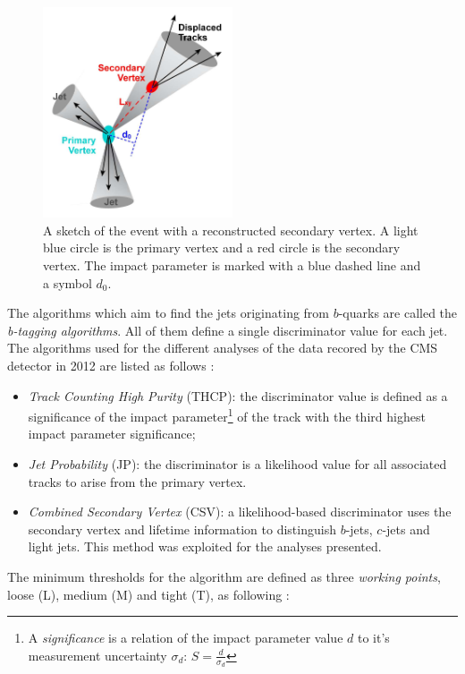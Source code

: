 \begin{figure}[t]
  \centering
  \includegraphics[width=0.5\textwidth]{04_event_reconstruction/plots/btagging_cartoon.png}
  \caption{A sketch of the event with a reconstructed secondary vertex. A light blue circle is the primary vertex and a red circle is the secondary vertex. The impact 
  parameter is marked with a blue dashed line and a symbol $d_{0}$.}
  \label{fig:SV}
\end{figure}

The algorithms which aim to find the jets originating from $b$-quarks are called the \textit{b-tagging algorithms}. All of them define a single discriminator value for each jet.
The algorithms used for the different analyses of the data recored by the CMS detector in 2012 are listed as follows \cite{CMS-PAS-BTV-13-001}: 

\begin{itemize}
 \item \textit{Track Counting High Purity} (THCP): the discriminator value is defined as a significance of the impact parameter\footnote{A \textit{significance} is a relation 
 of the impact parameter value $d$ to it's measurement uncertainty $\sigma_{d}$: $S = \frac{d}{\sigma_{d}}$} of the track with the third highest
 impact parameter significance;
 \item \textit{Jet Probability} (JP): the discriminator is a likelihood value for all associated tracks to arise from the primary vertex. 
 \item \textit{Combined Secondary Vertex} (CSV): a likelihood-based discriminator uses the secondary vertex and lifetime information to distinguish $b$-jets, $c$-jets
 and light jets. This method was exploited for the analyses presented.
\end{itemize}

The minimum thresholds for the algorithm are defined as three \textit{working points}, loose (L), medium (M) and tight (T), as following \cite{CMS-PAS-BTV-13-001}:

